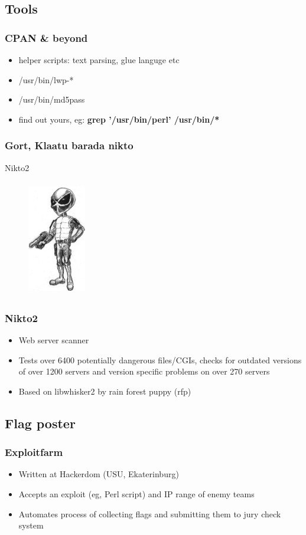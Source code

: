 \documentclass{beamer}
\begin{document}
\subsection{Tools}
\frame
{
\frametitle{CPAN \& beyond}
\begin{itemize}
\item<1-> helper scripts: text parsing, glue languge etc
\item<2-> /usr/bin/lwp-*
\item<2-> /usr/bin/md5pass
\item<3-> find out yours, eg: \textbf{grep '/usr/bin/perl' /usr/bin/*}
\end{itemize}
}

\frame
{
\frametitle{Gort, Klaatu barada nikto}
Nikto2
\begin{figure}
\includegraphics[width=1in,height=2in]{pics/nikto.png}
\end{figure}
}

\frame
{
\frametitle{Nikto2}
\begin{itemize}
\item Web server scanner
\item Tests over 6400 potentially dangerous files/CGIs, checks for outdated versions of over 1200 servers and version specific problems on over 270 servers
\item Based on libwhisker2 by rain forest puppy (rfp)
\end{itemize}
}

\subsection{Flag poster}
\frame
{
\frametitle{Exploitfarm}
\begin{itemize}
\item Written at Hackerdom (USU, Ekaterinburg)
\item Accepts an exploit (eg, Perl script) and IP range of enemy teams
\item Automates process of collecting flags and submitting them to jury check system
\end{itemize}
}
\end{document}
